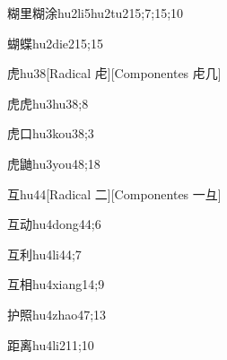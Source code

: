 \begin{verbete}{糊里糊涂}{hu2li5hu2tu2}{15;7;15;10}
\end{verbete}

\begin{verbete}{蝴蝶}{hu2die2}{15;15}
\end{verbete}

\begin{verbete}{虎}{hu3}{8}[Radical ⾌][Componentes ⾌几]
\end{verbete}

\begin{verbete}{虎虎}{hu3hu3}{8;8}
\end{verbete}

\begin{verbete}{虎口}{hu3kou3}{8;3}
\end{verbete}

\begin{verbete}{虎鼬}{hu3you4}{8;18}
\end{verbete}

\begin{verbete}{互}{hu4}{4}[Radical ⼆][Componentes ⼀⺔]
\end{verbete}

\begin{verbete}{互动}{hu4dong4}{4;6}
\end{verbete}

\begin{verbete}{互利}{hu4li4}{4;7}
\end{verbete}

\begin{verbete}{互相}{hu4xiang1}{4;9}
\end{verbete}

\begin{verbete}{护照}{hu4zhao4}{7;13}
\end{verbete}

\begin{verbete}{距离}{hu4li2}{11;10}
\end{verbete}


